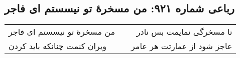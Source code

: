 \begin{center}
\section*{رباعی شماره ۹۲۱: من مسخرهٔ تو نیسستم ای فاجر}
\label{sec:0921}
\begin{longtable}{l p{0.5cm} r}
من مسخرهٔ تو نیسستم ای فاجر
&&
تا مسخرگی نمایمت بس نادر
\\
ویران کنمت چنانکه باید کردن
&&
عاجز شود از عمارتت هر عامر
\\
\end{longtable}
\end{center}

